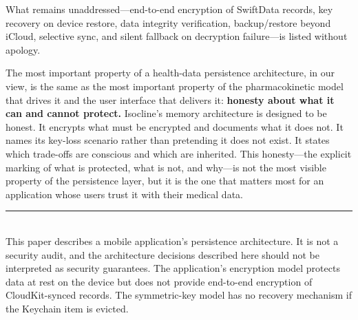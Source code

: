 \documentclass[11pt,a4paper]{article}
\begin{document}
What remains unaddressed---end-to-end encryption of SwiftData records, key
recovery on device restore, data integrity verification, backup/restore
beyond iCloud, selective sync, and silent fallback on decryption
failure---is listed without apology.

The most important property of a health-data persistence architecture, in
our view, is the same as the most important property of the pharmacokinetic
model that drives it and the user interface that delivers it: \textbf{honesty
about what it can and cannot protect.} Isocline's memory architecture is designed
to be honest. It encrypts what must be encrypted and documents what it does
not. It names its key-loss scenario rather than pretending it does not exist.
It states which trade-offs are conscious and which are inherited. This
honesty---the explicit marking of what is protected, what is not, and
why---is not the most visible property of the persistence layer, but it is
the one that matters most for an application whose users trust it with their
medical data.

\vfill
\noindent\rule{\linewidth}{0.4pt}\\[0.3em]
{\footnotesize This paper describes a mobile application's persistence
architecture. It is not a security audit, and the architecture decisions
described here should not be interpreted as security guarantees. The
application's encryption model protects data at rest on the device but does
not provide end-to-end encryption of CloudKit-synced records. The
symmetric-key model has no recovery mechanism if the Keychain item is
evicted.}
\end{document}
